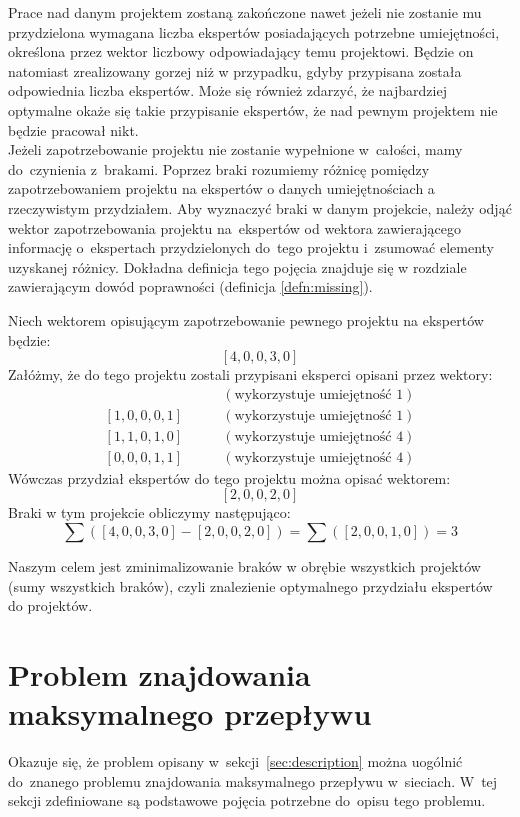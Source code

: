 \documentclass[12pt,a4paper]{article}
\theoremstyle{definition}
\begin{document}
\noindent
Prace nad danym projektem zostaną zakończone nawet jeżeli nie zostanie mu przydzielona wymagana liczba ekspertów posiadających potrzebne umiejętności, określona przez wektor liczbowy odpowiadający temu projektowi. Będzie on natomiast zrealizowany gorzej niż w przypadku, gdyby przypisana została odpowiednia liczba ekspertów. Może się również zdarzyć, że najbardziej optymalne okaże się takie przypisanie ekspertów, że nad pewnym projektem nie będzie pracował nikt.\\

\noindent
Jeżeli zapotrzebowanie projektu nie zostanie wypełnione w~całości, mamy do~czynienia z~brakami. Poprzez braki rozumiemy różnicę pomiędzy zapotrzebowaniem projektu na ekspertów o danych umiejętnościach a rzeczywistym przydziałem. Aby wyznaczyć braki w danym projekcie, należy odjąć wektor zapotrzebowania projektu na~ekspertów od wektora zawierającego informację o~ekspertach przydzielonych do~tego projektu i~zsumować elementy uzyskanej różnicy. Dokładna definicja tego pojęcia znajduje się w rozdziale zawierającym dowód poprawności (definicja \ref{defn:missing}).\\

\begin{tcolorbox}[title=Przykład --- obliczanie liczby braków]
Niech wektorem opisującym zapotrzebowanie pewnego projektu na ekspertów będzie:
$$[4, 0, 0, 3, 0]$$
Załóżmy, że do tego projektu zostali przypisani eksperci opisani przez wektory:
\begin{align*}
[1, 0, 1, 0, 1] & \qquad (\text{wykorzystuje umiejętność }1) \\
[1, 0, 0, 0, 1] & \qquad (\text{wykorzystuje umiejętność }1) \\
[1, 1, 0, 1, 0] & \qquad (\text{wykorzystuje umiejętność }4) \\
[0, 0, 0, 1, 1] & \qquad (\text{wykorzystuje umiejętność }4)
\end{align*}
Wówczas przydział ekspertów do tego projektu można opisać wektorem:
$$[2, 0, 0, 2, 0]$$
Braki w tym projekcie obliczymy następująco:
$$\sum([4, 0, 0, 3, 0] - [2, 0, 0, 2, 0]) = \sum([2, 0, 0, 1, 0]) = 3$$
\end{tcolorbox}

\vspace{0.5em}
\noindent
Naszym celem jest zminimalizowanie braków w obrębie wszystkich projektów (sumy wszystkich braków), czyli znalezienie optymalnego przydziału ekspertów do projektów.

\section{Problem znajdowania maksymalnego przepływu}
\label{sec:maxflow}
Okazuje się, że problem opisany w~sekcji~\ref{sec:description} można uogólnić
do~znanego problemu znajdowania maksymalnego przepływu w~sieciach. W~tej sekcji
zdefiniowane są podstawowe pojęcia potrzebne do~opisu tego problemu.
\end{document}
